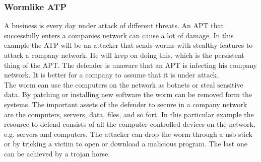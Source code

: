 \subsubsection*{Wormlike ATP}
A business is every day under attack of different threats. An APT that successfully enters a companies network can cause a lot of damage. In this example the ATP will be an attacker that sends worms with stealthy features to attack a company network. He will keep on doing this, which is the persistent thing of the APT. The defender is unaware that an APT is infecting his company network. It is better for a company to assume that it is under attack. \\
The worm can use the computers on the network as botnets or steal sensitive data. By patching or installing new software the worm can be removed form the systems. The important assets of the defender to secure in a company network are the computers, servers, data, files, and so fort. In this particular example the resource to defend consists of all the computer controlled devices on the network, e.g. servers and computers. The attacker can drop the worm through a usb stick or by tricking a victim to open or download a malicious program. The last one can be achieved by a trojan horse. 
